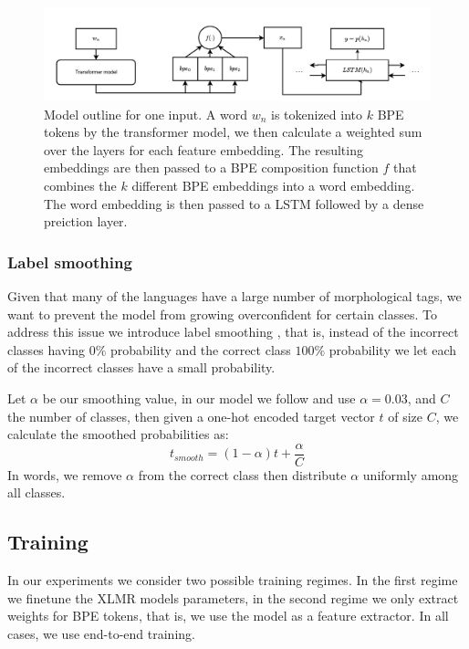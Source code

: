 \documentclass[11pt]{article}
\newcommand\citep{\cite}
\begin{document}
	\begin{figure}%
          \centering
	\includegraphics[scale=0.5]{single_step2.pdf}
        \caption{\label{fig:model} Model outline for one input. A word
     $w_n$ is tokenized into $k$ BPE tokens by the transformer model,
     we then calculate a weighted sum over the layers for each feature
     embedding. The resulting embeddings are then passed to a BPE
     composition function $f$ that combines the $k$ different
     BPE embeddings into a word embedding. The word embedding is then
     passed to a LSTM followed by a dense preiction layer. }
	\end{figure}

	\subsubsection{Label smoothing}
    	Given that many of the languages have a large number of
     morphological tags, we want to prevent the model from growing
     overconfident for certain classes. To address this issue we
     introduce label smoothing \cite{szegedy2016rethinking}, that is,
     instead of the incorrect classes having $0\%$ probability and the
     correct class $100\%$ probability we let each of the incorrect
     classes have a small probability.

         Let $\alpha$ be our smoothing value, in our model we follow
     \citep{kondratyukstraka} and use $\alpha = 0.03$, and $C$ the
     number of classes, then given a one-hot encoded target vector $t$
     of size $C$, we calculate the smoothed probabilities as:
    \begin{equation}
        t_{smooth} = (1-\alpha)t + \frac{\alpha}{C}
    \end{equation}
    In words, we remove $\alpha$ from the correct class then
    distribute $\alpha$ uniformly among all classes.
     \subsection{Training}

     In our experiments we consider two possible training regimes. In
     the first regime we finetune the XLMR models parameters, in the
     second regime we only extract weights for BPE tokens, that is, we
     use the model as a feature extractor. In all cases, we use
     end-to-end training.
\end{document}
